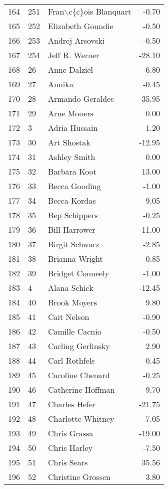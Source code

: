 \begin{table}[ht]
\begin{tabular}{rllr}
  164 & 251 & Fran$\backslash$c\{c\}ois Blanquart & -0.70 \\ 
  165 & 252 & Elizabeth Goundie & -0.50 \\ 
  166 & 253 & Andrej Arsovski & -0.50 \\ 
  167 & 254 & Jeff R. Werner & -28.10 \\ 
  168 & 26 & Anne Dalziel & -6.80 \\ 
  169 & 27 & Annika & -0.45 \\ 
  170 & 28 & Armando Geraldes & 35.95 \\ 
  171 & 29 & Arne Mooers & 0.00 \\ 
  172 & 3 & Adria Hussain & 1.20 \\ 
  173 & 30 & Art Shostak & -12.95 \\ 
  174 & 31 & Ashley Smith & 0.00 \\ 
  175 & 32 & Barbara Koot & 13.00 \\ 
  176 & 33 & Becca Gooding & -1.00 \\ 
  177 & 34 & Becca Kordas & 9.05 \\ 
  178 & 35 & Bep Schippers & -0.25 \\ 
  179 & 36 & Bill Harrower & -11.00 \\ 
  180 & 37 & Birgit Schwarz & -2.85 \\ 
  181 & 38 & Brianna Wright & -0.85 \\ 
  182 & 39 & Bridget Conneely & -1.00 \\ 
  183 & 4 & Alana Schick & -12.45 \\ 
  184 & 40 & Brook Moyers & 9.80 \\ 
  185 & 41 & Cait Nelson & -0.90 \\ 
  186 & 42 & Camille Cacnio & -0.50 \\ 
  187 & 43 & Carling Gerlinsky & 2.90 \\ 
  188 & 44 & Carl Rothfels & 0.45 \\ 
  189 & 45 & Caroline Chenard & -0.25 \\ 
  190 & 46 & Catherine Hoffman & 9.70 \\ 
  191 & 47 & Charles Hefer & -21.75 \\ 
  192 & 48 & Charlotte Whitney & -7.05 \\ 
  193 & 49 & Chris Grassa & -19.00 \\ 
  194 & 50 & Chris Harley & -7.50 \\ 
  195 & 51 & Chris Sears & 35.56 \\ 
  196 & 52 & Christine Grossen & 3.80 \\ 

\end{tabular}
\end{table}
